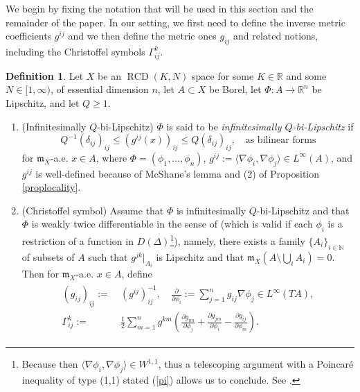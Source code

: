 \documentclass[11pt,reqno]{amsart}
\theoremstyle{definition}
\newtheorem{definition}[theorem]{Definition}
\numberwithin{equation}{section}
\newcommand{\meas}{\mathfrak{m}}
\DeclareMathOperator{\RCD}{RCD}
\begin{document}
We begin by fixing the notation that will be used in this section and the remainder of the paper. In our setting, we first need to define the inverse metric coefficients $g^{ij}$ and we then define the metric ones $g_{ij}$ and related notions, including the Christoffel symbols $\Gamma_{ij}^k$.

\begin{definition}\label{def:chris}
    Let $X$ be an $\RCD(K, N)$ space for some $K \in \mathbb{R}$ and some $N \in [1, \infty)$, of essential dimension $n$, let $A \subset X$ be   Borel,  let $\Phi:A \to \mathbb{R}^n$ be  Lipschitz, and let $Q \ge 1$.  
    \begin{enumerate}
        \item{(Infinitesimally $Q$-bi-Lipschitz)}  
         $\Phi$ is said to be \textit{infinitesimally $Q$-bi-Lipschitz} if 
        \begin{equation}\label{bilip}
Q^{-1}(\delta_{ij})_{ij}\le\left(g^{i j}(x)\right)_{ij}\le Q(\delta_{ij})_{ij}, \quad \text{as bilinear forms} 
\end{equation}
for $\meas_X$-a.e. $x \in A$, where $\Phi=(\phi_1,\ldots, \phi_n)$, $
g^{ij}:=\langle \nabla \phi_i, \nabla \phi_j\rangle \in L^{\infty}(A)$,
and $g^{ij}$ is well-defined because of McShane's lemma and (2) of Proposition \ref{proplocality}. 
\item{(Christoffel symbol)} Assume that $\Phi$ is infinitesimally $Q$-bi-Lipschitz  and that $\Phi$ is weakly twice differentiable in the sense of \cite{Honda1} (which is valid if each $\phi_i$ is a restriction of a function in $D(\Delta)$\footnote{Because then $\langle \nabla \phi_i, \nabla \phi_j\rangle \in W^{1,1}$, thus a telescoping argument with a Poincar\'e inequality of type (1,1) stated (\ref{pi}) allows us to conclude. See \cite[subsection 4.2]{Honda1}.}), namely, there exists a family $\{A_i\}_{i \in \mathbb{N}}$ of subsets of $A$ such that $g^{jk}|_{A_i}$ is Lipschitz and that $\meas_X(A \setminus \bigcup_iA_i)=0$.  Then for $\meas_X$-a.e. $x \in A$, define
\begin{align} \begin{split}
 \label{inveq} 
(g_{i j})_{ij}:= & \ (g^{ij})_{ij}^{-1}, \quad \frac{\partial}{\partial \phi_i}:=\sum_{j=1}^ng_{i j}\nabla \phi_j \in L^{\infty}(TA), \\   \Gamma^k_{ij}:= & \ \frac{1}{2}\sum_{m=1}^ng^{km}\left(\frac{\partial g_{im}}{\partial \phi_j}+\frac{\partial g_{jm}}{\partial \phi_i}-\frac{\partial g_{ij}}{\partial \phi_m}\right).
\end{split}
\end{align}
    \end{enumerate}
\end{definition}
\end{document}

